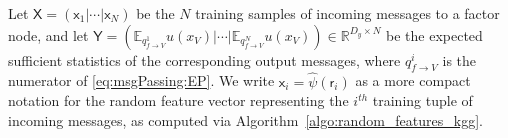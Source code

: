 \documentclass[english]{article}
\theoremstyle{plain}
\theoremstyle{plain}
\newcommand{\factor}{f}				%
\newcommand{\outV}{V}                         %
\newcommand{\agnote}[1]{}
\begin{document}
%

Let $\mathsf{X}=\left(\mathsf{x}_{1}|\cdots|\mathsf{x}_{N}\right)$
be the $N$ training samples of incoming messages to a factor node, and let $\mathsf{Y}=\left(\mathbb{E}_{q_{\factor\rightarrow \outV}^{1}}u(x_{\outV})|\cdots|\mathbb{E}_{q_{f\rightarrow \outV}^{N}}u(x_{\outV})\right)\in\mathbb{R}^{D_{y}\times N}$
be the expected sufficient statistics of the corresponding  output messages, 
where $q^i_{\factor \rightarrow \outV}$ is the numerator 
of \eqref{eq:msgPassing:EP}.
We write $\mathsf{x}_{i}= \hat{\psi}(\mathsf{r}_i)$
as a more compact notation for the random feature
vector representing the $i^{th}$ training tuple of incoming messages,
as computed via Algorithm~\ref{algo:random_features_kgg}. 


\end{document}
